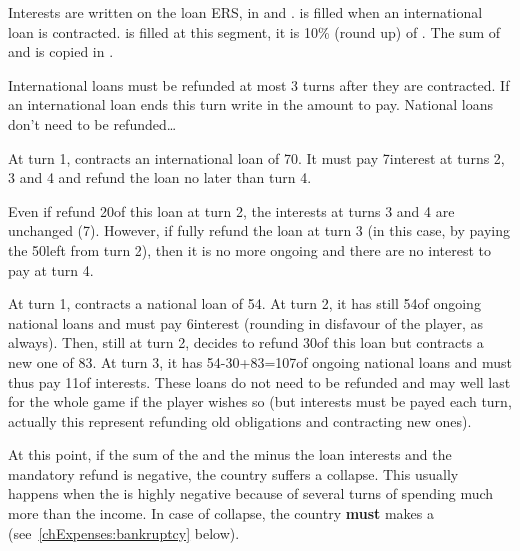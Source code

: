 \aparag Interests are written on the loan ERS, in  and .
\bparag {} is filled when an
international loan is contracted.
\bparag {} is filled at this segment, it
is 10\% (round up) of .
\bparag The sum of  and
 is copied in .

 International loans must be refunded at most 3 turns
after they are contracted. If an international loan ends this turn write in
 the amount to pay.
\bparag National loans don't need to be refunded\ldots

\begin{exemple}
  At turn 1, \POR contracts an international loan of 70\ducats. It must pay
  7\ducats interest at turns 2, 3 and 4 and refund the loan no later than turn
  4.

  Even if \POR refund 20\ducats of this loan at turn 2, the interests at turns
  3 and 4 are unchanged (7\ducats). However, if \POR fully refund the loan at
  turn 3 (in this case, by paying the 50\ducats left from turn 2), then it is
  no more ongoing and there are no interest to pay at turn 4.

  \smallskip

  At turn 1, \FRA contracts a national loan of 54\ducats. At turn 2, it has
  still 54\ducats of ongoing national loans and must pay 6\ducats interest
  (rounding in disfavour of the player, as always). Then, still at turn 2,
  \FRA decides to refund 30\ducats of this loan but contracts a new one of
  83\ducats. At turn 3, it has 54-30+83=107\ducats of ongoing national loans
  and must thus pay 11\ducats of interests. These loans do not need to be
  refunded and may well last for the whole game if the player wishes so (but
  interests must be payed each turn, actually this represent refunding old
  obligations and contracting new ones).
\end{exemple}

 At this point, if the sum of the \RT and the
 minus the loan interests and the mandatory refund is
negative, the country suffers a collapse. This usually happens when the \RT is
highly negative because of several turns of spending much more than the
income.
\bparag In case of collapse, the country \textbf{must} makes a  (see~\ref{chExpenses:bankruptcy} below).



